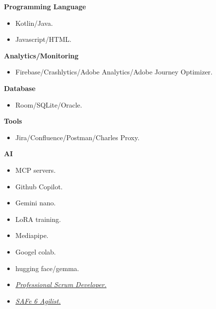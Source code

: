 \documentclass[10pt,a4paper,withhyper]{altacv}
\begin{document}
\begin{paracol}{2}
\textbf{Programming Language}

\begin{itemize}
	\item Kotlin/Java.
	\item Javascript/HTML.
\end{itemize}
\divider

\textbf{Analytics/Monitoring}

\begin{itemize}
	\item Firebase/Crashlytics/Adobe Analytics/Adobe Journey Optimizer.
\end{itemize}
\divider

\textbf{Database}

\begin{itemize}
	\item Room/SQLite/Oracle.
\end{itemize}
\divider

\textbf{Tools}

\begin{itemize}
	\item Jira/Confluence/Postman/Charles Proxy.
\end{itemize}
\divider

\textbf{AI}

\begin{itemize}
	\item MCP servers.
	\item Github Copilot.
	\item Gemini nano.
	\item LoRA training.
	\item Mediapipe.
		\item Googel colab.
	\item hugging face/gemma.
\end{itemize}




\divider

\divider




\begin{itemize}
\item \href{https://www.scrum.org/user/418540}{\textit{Professional Scrum Developer.}}
\item \href{https://community.scaledagile.com/apex/PrintAchievement?aid=a0t6T00000O8QGyQAN&aaid=a0rQo00001ie1R1IAI}{\textit{SAFe 6 Agilist.}}
\end{itemize}


\end{paracol}
\end{document}
